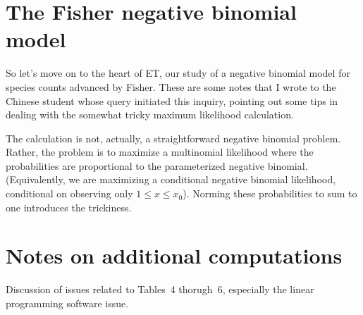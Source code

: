 \documentclass[
  letterpaper, %
  11pt, %
  oneside,  %
  onecolumn,  %
  openany,  %
  article
]{memoir}
\begin{document}
\chapter[]{The Fisher negative binomial model} %
\label{cha:the_fisher_negative_binomial_model}

So let's move on to the heart of ET, our study of a negative binomial model for species counts advanced by Fisher.  These are some notes that I wrote to the Chinese student whose query initiated this inquiry, pointing out some tips in dealing with the somewhat tricky maximum likelihood calculation.

The calculation is not, actually, a straightforward negative binomial problem.  Rather, the problem is to maximize a multinomial likelihood where the probabilities are proportional to the parameterized negative binomial.  (Equivalently, we are maximizing a conditional negative binomial likelihood, conditional on observing only $1 \le x \le x_0$).  Norming these probabilities to sum to one introduces the trickiness.



\chapter{Notes on additional computations} %
\label{cha:notes_on_additional_computations}

	Discussion of issues related to Tables~4 thorugh~6, especially the linear programming software issue.
	

\newpage
\appendix
\end{document}
